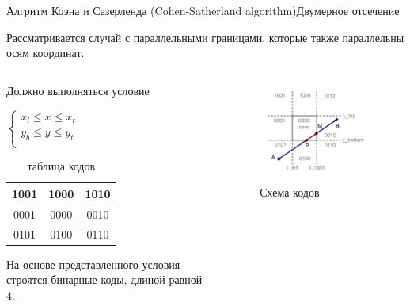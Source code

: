 \documentclass{beamer}
\begin{document}
	\begin{frame}{Алгритм Коэна и Сазерленда (Cohen-Satherland algorithm)}{Двумерное отсечение}

		Рассматривается случай с параллельными границами, которые также параллельны осям координат.
		\begin{columns}
			\begin{column}{0.6\textwidth}
				Должно выполняться условие
				
				$
					\begin{cases}
						x_l \leqslant x \leqslant x_r \\
						y_b \leqslant y \leqslant y_t	\\
					\end{cases}
				$
				
				\begin{table}
					\caption{таблица кодов}
					\begin{center}
						\begin{tabular}{|c|c|c|}
							\hline
							1001 & 1000 & 1010 \\
							\hline
							0001 & 0000 & 0010 \\
							\hline
							0101 & 0100 & 0110 \\
							\hline
						\end{tabular}
					\end{center}
				\end{table}

				На основе представленного условия строятся бинарные коды, длиной равной 4.
			\end{column}
			\begin{column}{0.4\textwidth}
				\begin{figure} 
					\includegraphics[width=\textwidth]{images/clipping_ex3.jpg}
					\caption{Схема кодов}
				\end{figure}
			\end{column}
		\end{columns}


\end{frame}
\end{document}

